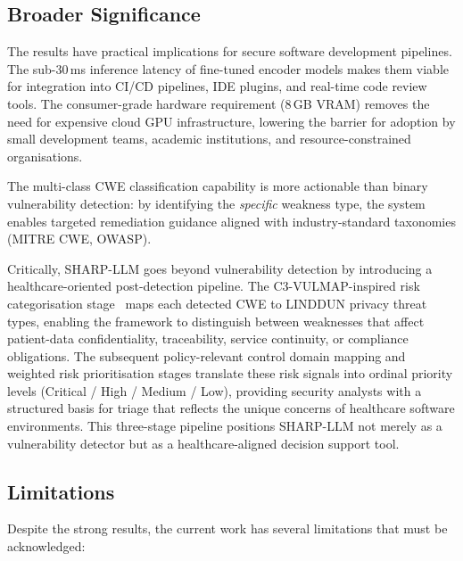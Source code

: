 \subsection{Broader Significance}
\label{sec:significance}

The results have practical implications for secure software development
pipelines.  The sub-30\,ms inference latency of fine-tuned encoder models
makes them viable for integration into CI/CD pipelines, IDE plugins, and
real-time code review tools.  The consumer-grade hardware requirement
(8\,GB VRAM) removes the need for expensive cloud GPU infrastructure,
lowering the barrier for adoption by small development teams, academic
institutions, and resource-constrained organisations.

The multi-class CWE classification capability is more actionable than binary
vulnerability detection: by identifying the \emph{specific} weakness type,
the system enables targeted remediation guidance aligned with
industry-standard taxonomies (MITRE CWE, OWASP).

Critically, SHARP-LLM goes beyond vulnerability detection by introducing a
healthcare-oriented post-detection pipeline.  The C3-VULMAP-inspired risk
categorisation stage~\cite{santos2023c3vulmap} maps each detected CWE to
LINDDUN privacy threat types, enabling the framework to distinguish between
weaknesses that affect patient-data confidentiality, traceability, service
continuity, or compliance obligations.  The subsequent policy-relevant
control domain mapping and weighted risk prioritisation stages translate
these risk signals into ordinal priority levels (Critical / High / Medium /
Low), providing security analysts with a structured basis for triage that
reflects the unique concerns of healthcare software environments.  This
three-stage pipeline positions SHARP-LLM not merely as a vulnerability
detector but as a healthcare-aligned decision support tool.

\subsection{Limitations}
\label{sec:limitations}

Despite the strong results, the current work has several limitations that
must be acknowledged:

